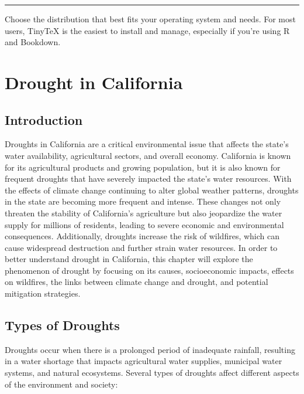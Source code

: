 \documentclass[
]{book}
\theoremstyle{definition}
\theoremstyle{definition}
\theoremstyle{definition}
\theoremstyle{definition}
\theoremstyle{remark}
\begin{document}
\begin{center}\rule{0.5\linewidth}{0.5pt}\end{center}

Choose the distribution that best fits your operating system and needs. For most users, TinyTeX is the easiest to install and manage, especially if you're using R and Bookdown.

\chapter{Drought in California}\label{drought-in-california}

\section{Introduction}\label{introduction}

Droughts in California are a critical environmental issue that affects the state's water availability, agricultural sectors, and overall economy. California is known for its agricultural products and growing population, but it is also known for frequent droughts that have severely impacted the state's water resources. With the effects of climate change continuing to alter global weather patterns, droughts in the state are becoming more frequent and intense. These changes not only threaten the stability of California's agriculture but also jeopardize the water supply for millions of residents, leading to severe economic and environmental consequences. Additionally, droughts increase the risk of wildfires, which can cause widespread destruction and further strain water resources. In order to better understand drought in California, this chapter will explore the phenomenon of drought by focusing on its causes, socioeconomic impacts, effects on wildfires, the links between climate change and drought, and potential mitigation strategies.

\section{Types of Droughts}\label{types-of-droughts}

Droughts occur when there is a prolonged period of inadequate rainfall, resulting in a water shortage that impacts agricultural water supplies, municipal water systems, and natural ecosystems. Several types of droughts affect different aspects of the environment and society:
\end{document}

